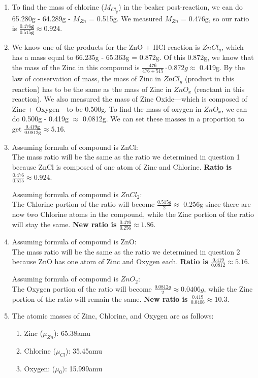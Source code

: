 \documentclass{article}
\begin{document}
\begin{enumerate}
\item To find the mass of chlorine ($M_{Cl_{y}}$) in the beaker post-reaction, we can do 65.280g - 64.289g - $M_{Zn}$ = 0.515g. We measured $M_{Zn}$ = 0.476g, so our ratio is $\mathbf{\frac{0.476g}{0.515g} \approx 0.924}$.

\item  We know one of the products for the ZnO + HCl reaction is $ZnCl_{y}$, which has a mass equal to 66.235g - 65.363g = 0.872g. Of this 0.872g, we know that the mass of the Zinc in this compound is $\frac{476}{476 + 515} \cdot 0.872g \approx$ 0.419g. By the law of conservation of mass, the mass of Zinc in $ZnCl_{y}$ (product in this reaction) has to be the same as the mass of Zinc in $ZnO_{x}$ (reactant in this reaction). We also measured the mass of Zinc Oxide---which is composed of Zinc + Oxygen---to be 0.500g. To find the mass of oxygen in $ZnO_{x}$, we can do 0.500g - 0.419g $\approx$ 0.0812g. We can set these masses in a proportion to get $\mathbf{\frac{0.419g}{0.0812g} \approx 5.16}$. 

\item Assuming formula of compound is ZnCl: \\
The mass ratio will be the same as the ratio we determined in question 1 because ZnCl is composed of one atom of Zinc and Chlorine. \textbf{Ratio is $\mathbf{\frac{0.476}{0.515} \approx 0.924}$}.

Assuming formula of compound is $ZnCl_{2}$: \\
The Chlorine portion of the ratio will become $\frac{0.515g}{2} \approx$ 0.256g since there are now two Chlorine atoms in the compound, while the Zinc portion of the ratio will stay the same. \textbf{New ratio is $\mathbf{\frac{0.476}{0.256} \approx 1.86}$}.

\item Assuming formula of compound is ZnO: \\
The mass ratio will be the same as the ratio we determined in question 2 because ZnO has one atom of Zinc and Oxygen each. \textbf{Ratio is $\mathbf{\frac{0.419}{0.0812} \approx 5.16}$}.

Assuming formula of compound is $ZnO_{2}$: \\
The Oxygen portion of the ratio will become $\frac{0.0812g}{2} \approx 0.0406g$, while the Zinc portion of the ratio will remain the same. \textbf{New ratio is $\mathbf{\frac{0.419}{0.0406} \approx 10.3}$}.

\item The atomic masses of Zinc, Chlorine, and Oxygen are as follows:
\begin{enumerate}
\item Zinc ($\mu_{Zn}$): 65.38amu
\item Chlorine ($\mu_{Cl}$): 35.45amu 
\item Oxygen: ($\mu_{0})$: 15.999amu
\end{enumerate}


\end{enumerate}
\end{document}
